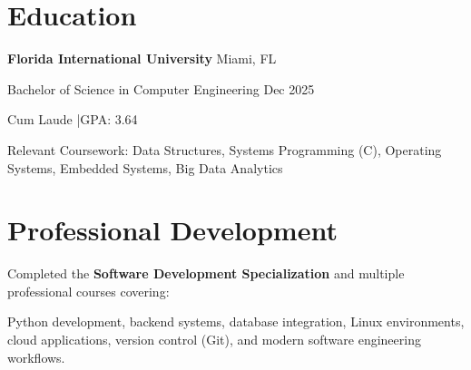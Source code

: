 \documentclass[10pt]{article}
\newcommand{\sep}{\;|\;}
\begin{document}
\section{Education}

\textbf{Florida International University} \hfill Miami, FL

Bachelor of Science in Computer Engineering \hfill Dec 2025

Cum Laude \sep GPA: 3.64

Relevant Coursework:
Data Structures, Systems Programming (C), Operating Systems, Embedded Systems, Big Data Analytics

\section{Professional Development}

Completed the \textbf{Software Development Specialization} and multiple professional courses covering:

Python development, backend systems, database integration, Linux environments, cloud applications, version control (Git), and modern software engineering workflows.
\end{document}
